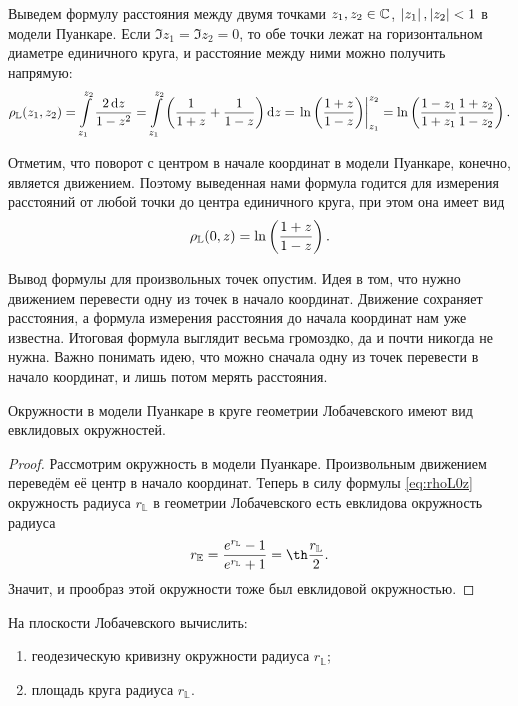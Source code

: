 Выведем формулу расстояния между двумя точками $z_1, z_2 \in \mathbb{C}$, $\left\lvert z_1\right\rvert, \left\lvert z_2\right\rvert < 1$ в модели Пуанкаре. Если $\Im z_1 = \Im z_2 = 0$, то обе точки лежат на горизонтальном диаметре единичного круга, и расстояние между ними можно получить напрямую:
\[
	\rho_{\mathbb{L}}(z_1, z_2) = \int\limits_{z_1}^{z_2}\frac{2\mathop{}\!\mathrm{d} z}{1 - z^2} = \int\limits_{z_1}^{z_2}\left(\frac{1}{1 + z} + \frac{1}{1 - z}\right)\mathop{}\!\mathrm{d} z = \left.\ln\left(\frac{1 + z}{1 - z}\right)\right|_{z_1}^{z_2} = \ln\left(\frac{1 - z_1}{1 + z_1}\frac{1 + z_2}{1 - z_2}\right).
\]

Отметим, что поворот с центром в начале координат в модели Пуанкаре, конечно, является движением. Поэтому выведенная нами формула годится для измерения расстояний от любой точки до центра единичного круга, при этом она имеет вид
\begin{equation} \label{eq:rhoL0z}
	\rho_{\mathbb{L}}(0, z) = \ln\left(\frac{1 + z}{1 - z}\right).
\end{equation}

Вывод формулы для произвольных точек опустим. Идея в том, что нужно движением перевести одну из точек в начало координат. Движение сохраняет расстояния, а формула измерения расстояния до начала координат нам уже известна. Итоговая формула выглядит весьма громоздко, да и почти никогда не нужна. Важно понимать идею, что можно сначала одну из точек перевести в начало координат, и лишь потом мерять расстояния.

\begin{proposition}
	Окружности в модели Пуанкаре в круге геометрии Лобачевского имеют вид евклидовых окружностей.
\end{proposition}

\begin{proof}
	Рассмотрим окружность в модели Пуанкаре. Произвольным движением переведём её центр в начало координат. Теперь в силу формулы \eqref{eq:rhoL0z} окружность радиуса $r_{\mathbb{L}}$ в геометрии Лобачевского есть евклидова окружность радиуса
	\begin{equation} \label{eq:LtoE}
		r_{\mathbb{E}} = \frac{e^{r_{\mathbb{L}}} - 1}{e^{r_{\mathbb{L}}} + 1} = \th\frac{r_{\mathbb{L}}}{2}.
	\end{equation}
	Значит, и прообраз этой окружности тоже был евклидовой окружностью.
\end{proof}

\begin{problem}
	На плоскости Лобачевского вычислить:
	\begin{enumerate}[nolistsep, label=(\arabic*)]
		\item геодезическую кривизну окружности радиуса $r_{\mathbb{L}}$;
		\item площадь круга радиуса $r_{\mathbb{L}}$.
	\end{enumerate}
\end{problem}

